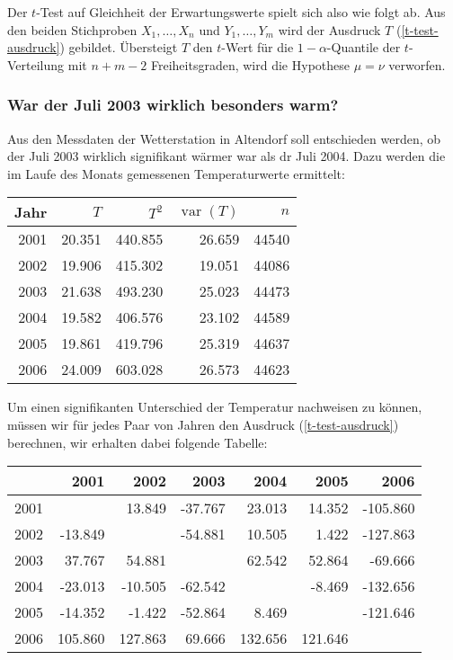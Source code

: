 Der $t$-Test auf Gleichheit der Erwartungswerte spielt sich also wie folgt
ab.
Aus den beiden Stichproben $X_1,\dots,X_n$ und $Y_1,\dots,Y_m$ wird
der Ausdruck $T$ (\ref{t-test-ausdruck}) gebildet.
Übersteigt $T$ den $t$-Wert für die $1-\alpha$-Quantile der $t$-Verteilung
mit $n+m-2$ Freiheitsgraden, wird die Hypothese $\mu=\nu$ verworfen.

\subsubsection{War der Juli 2003 wirklich besonders warm?} \label{julitemperaturen}
Aus den Messdaten der Wetterstation in Altendorf soll entschieden werden,
ob der Juli 2003 wirklich signifikant wärmer war als dr Juli 2004.
Dazu werden die im Laufe des Monats gemessenen Temperaturwerte
ermittelt:

\begin{center}
\begin{tabular}{|r|r|r|r|r|}
\hline
Jahr&$T$&$T^2$&$\operatorname{var}(T)$&$n$\\
\hline
2001&20.351&440.855&26.659&44540\\
2002&19.906&415.302&19.051&44086\\
2003&21.638&493.230&25.023&44473\\
2004&19.582&406.576&23.102&44589\\
2005&19.861&419.796&25.319&44637\\
2006&24.009&603.028&26.573&44623\\
\hline
\end{tabular}
\end{center}

Um einen signifikanten Unterschied der Temperatur nachweisen zu können,
müssen wir für jedes Paar von Jahren den Ausdruck (\ref{t-test-ausdruck})
berechnen, wir erhalten dabei folgende Tabelle:

\begin{center}
\begin{tabular}{|r|rrrrrr|}
\hline
    &    2001&    2002&    2003&    2004&    2005&     2006\\
\hline
2001&        &  13.849& -37.767&  23.013&  14.352& -105.860\\
2002& -13.849&        & -54.881&  10.505&   1.422& -127.863\\
2003&  37.767&  54.881&        &  62.542&  52.864&  -69.666\\
2004& -23.013& -10.505& -62.542&        &  -8.469& -132.656\\
2005& -14.352&  -1.422& -52.864&   8.469&        & -121.646\\
2006& 105.860& 127.863&  69.666& 132.656& 121.646&         \\
\hline
\end{tabular}
\end{center}

